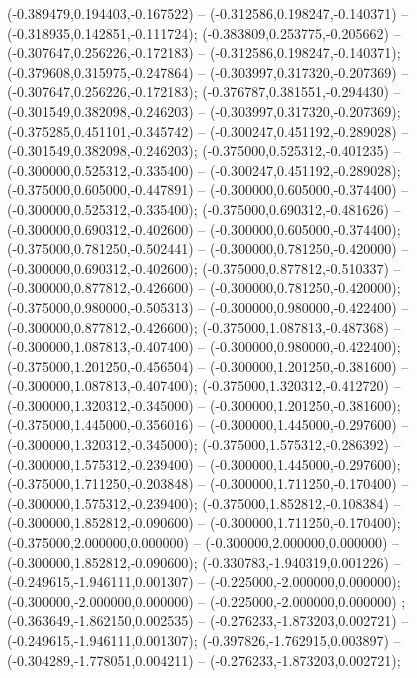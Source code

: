  (-0.389479,0.194403,-0.167522) -- (-0.312586,0.198247,-0.140371) -- (-0.318935,0.142851,-0.111724);
 (-0.383809,0.253775,-0.205662) -- (-0.307647,0.256226,-0.172183) -- (-0.312586,0.198247,-0.140371);
 (-0.379608,0.315975,-0.247864) -- (-0.303997,0.317320,-0.207369) -- (-0.307647,0.256226,-0.172183);
 (-0.376787,0.381551,-0.294430) -- (-0.301549,0.382098,-0.246203) -- (-0.303997,0.317320,-0.207369);
 (-0.375285,0.451101,-0.345742) -- (-0.300247,0.451192,-0.289028) -- (-0.301549,0.382098,-0.246203);
 (-0.375000,0.525312,-0.401235) -- (-0.300000,0.525312,-0.335400) -- (-0.300247,0.451192,-0.289028);
 (-0.375000,0.605000,-0.447891) -- (-0.300000,0.605000,-0.374400) -- (-0.300000,0.525312,-0.335400);
 (-0.375000,0.690312,-0.481626) -- (-0.300000,0.690312,-0.402600) -- (-0.300000,0.605000,-0.374400);
 (-0.375000,0.781250,-0.502441) -- (-0.300000,0.781250,-0.420000) -- (-0.300000,0.690312,-0.402600);
 (-0.375000,0.877812,-0.510337) -- (-0.300000,0.877812,-0.426600) -- (-0.300000,0.781250,-0.420000);
 (-0.375000,0.980000,-0.505313) -- (-0.300000,0.980000,-0.422400) -- (-0.300000,0.877812,-0.426600);
 (-0.375000,1.087813,-0.487368) -- (-0.300000,1.087813,-0.407400) -- (-0.300000,0.980000,-0.422400);
 (-0.375000,1.201250,-0.456504) -- (-0.300000,1.201250,-0.381600) -- (-0.300000,1.087813,-0.407400);
 (-0.375000,1.320312,-0.412720) -- (-0.300000,1.320312,-0.345000) -- (-0.300000,1.201250,-0.381600);
 (-0.375000,1.445000,-0.356016) -- (-0.300000,1.445000,-0.297600) -- (-0.300000,1.320312,-0.345000);
 (-0.375000,1.575312,-0.286392) -- (-0.300000,1.575312,-0.239400) -- (-0.300000,1.445000,-0.297600);
 (-0.375000,1.711250,-0.203848) -- (-0.300000,1.711250,-0.170400) -- (-0.300000,1.575312,-0.239400);
 (-0.375000,1.852812,-0.108384) -- (-0.300000,1.852812,-0.090600) -- (-0.300000,1.711250,-0.170400);
 (-0.375000,2.000000,0.000000) -- (-0.300000,2.000000,0.000000) -- (-0.300000,1.852812,-0.090600);
 (-0.330783,-1.940319,0.001226) -- (-0.249615,-1.946111,0.001307) -- (-0.225000,-2.000000,0.000000);
 (-0.300000,-2.000000,0.000000) -- (-0.225000,-2.000000,0.000000) ;
 (-0.363649,-1.862150,0.002535) -- (-0.276233,-1.873203,0.002721) -- (-0.249615,-1.946111,0.001307);
 (-0.397826,-1.762915,0.003897) -- (-0.304289,-1.778051,0.004211) -- (-0.276233,-1.873203,0.002721);
